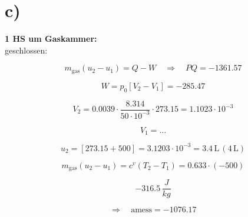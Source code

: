 

\section*{c)}

\textbf{1 HS um Gaskammer:} \\
geschlossen:

\[
m_{\text{gas}} (u_2 - u_1) = Q - W \quad \Rightarrow \quad PQ = -1361.57
\]

\[
W = p_0 \left[ V_2 - V_1 \right] = -285.47
\]

\[
V_2 = 0.0039 \cdot \frac{8.314}{50 \cdot 10^{-3}} \cdot 273.15 = 1.1023 \cdot 10^{-3}
\]

\[
V_1 = \ldots
\]

\[
u_2 = \left[ 273.15 + 500 \right] = 3.1203 \cdot 10^{-3} = 3.4 \, \text{L} \, (4 \, \text{L})
\]

\[
m_{\text{gas}} \left( u_2 - u_1 \right) = c^v \left( T_2 - T_1 \right) = 0.633 \cdot (-500)
\]

\[
-316.5 \, \frac{J}{kg}
\]

\[
\Rightarrow \quad \text{amess} = -1076.17
\]